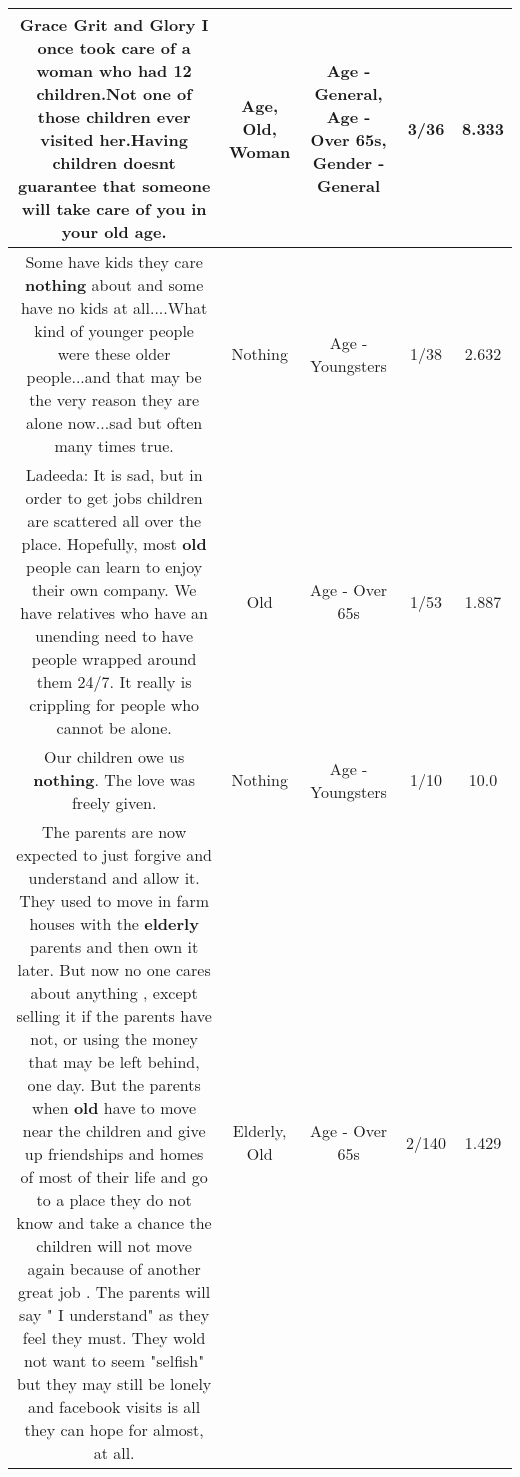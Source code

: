 \documentclass[11pt]{article}
\newlength\mylength
\begin{document}
\begin{center}
\begin{longtable}{|C{.65\mylength}|C{.30\mylength}|C{.12\mylength}|C{.12\mylength}|C{.12\mylength}|}
  \small Grace Grit and Glory I once took care of a \textbf{woman} who had 12 children.Not one of those children ever visited her.Having children doesnt guarantee that someone will take care of you in your \textbf{old} \textbf{age}.\normalsize   & Age, Old, Woman & Age - General, Age - Over 65s, Gender - General & 3/36 & 8.333 \\  \hline
  \small Some have kids they care \textbf{nothing} about and some have no kids at all....What kind of younger people were these older people...and that may be the very reason they are alone now...sad but often many times true.\normalsize   & Nothing & Age - Youngsters & 1/38 & 2.632 \\  \hline
  \small Ladeeda:  It is sad, but in order to get jobs children are scattered all over the place.  Hopefully, most \textbf{old} people can learn to enjoy their own company.  We have relatives who have an unending need to have people wrapped around them 24/7.  It really is crippling for people who cannot be alone.\normalsize   & Old & Age - Over 65s & 1/53 & 1.887 \\  \hline
  \small Our children owe us \textbf{nothing}. The love was freely given.\normalsize   & Nothing & Age - Youngsters & 1/10 & 10.0 \\  \hline
  \small The parents are now expected to just forgive and understand and allow it. They used to move in farm houses with the \textbf{elderly} parents and then own it later. But now no one cares about anything , except selling it if the parents have not, or using the money that may be left behind, one day. But the parents when \textbf{old} have to move near the children and give up friendships and homes of most of their life and go to a place they do not know and take a chance the children will not move again because of another great job . The parents will say " I understand" as they feel they must. They wold not want to seem "selfish" but they may still be lonely and facebook visits is all they can hope for almost, at all.\normalsize   & Elderly, Old & Age - Over 65s & 2/140 & 1.429 \\  \hline

\end{longtable}
\end{center}
\end{document}
